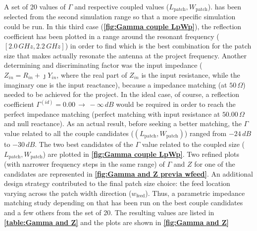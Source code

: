 \documentclass[10 pt,a4paper,twocolumn]{article}
\begin{document}
{%
A set of 20 values of $\Gamma$ and respective coupled values ($L_{\operatorname{patch}},W_{\operatorname{patch}}$). has been selected from the second simulation range so that a more specific simulation could be run. In this third case (\textbf{\cref{fig:Gamma couple LpWp}}), the reflection coefficient has been plotted in a range around the resonant frequency ($[2.0\,GHz, 2.2\,GHz]$) in order to find which is the best combination for the patch size that makes actually resonate the antenna at the project frequency. Another determining and discriminating factor was the input impedance ($Z_{in}=R_{in}+\jmath Y_{in}$, where the real part of $Z_{in}$ is the input resistance, while the imaginary one is the input reactance), because a impedance matching (at $50\,\Omega$) needed to be achieved for the project. In the ideal case, of course, a reflection coefficient $\Gamma^{(id)}=0.00\,\to\,-\infty\,dB$ would be required in order to reach the perfect impedance matching (perfect matching with input resistance at $50.00\,\Omega$ and null reactance). As an actual result, before seeking a better matching, the $\Gamma$ value related to all the couple candidates ($(L_{\operatorname{patch}},W_{\operatorname{patch}})$) ranged from $-24\,dB$ to $-30\,dB$. The two best candidates of the $\Gamma$ value related to the coupled size ($L_{\operatorname{patch}},W_{\operatorname{patch}}$) are plotted in \textbf{\cref{fig:Gamma couple LpWp}}. Two refined plots (with narrower frequency steps in the same range) of $\Gamma$ and $Z$ for one of the candidates are represented in \textbf{\cref{fig:Gamma and Z previa wfeed}}. An additional design strategy contributed to the final patch size choice: the feed location varying across the patch width direction ($w_{\operatorname{feed}}$). Thus, a parametric impedance matching study depending on that has been run on the best couple candidates and a few others from the set of 20. The resulting values are listed in \textbf{\cref{table:Gamma and Z}} and the plots are shown in \textbf{\cref{fig:Gamma and Z}}


}
\end{document}
